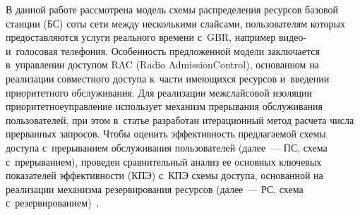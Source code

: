 \begin{multicols}{2}
В данной работе рассмотрена модель схемы распределения ресурсов базовой 
станции (БС) соты сети между несколькими слайсами, пользователям которых 
предоставляются услуги реального времени с~GBR, например видео- и~голосовая 
телефония.
Особенность предложенной модели заключается в~управлении доступом RAC 
(Radio Admission\linebreak Control), основанном на реализации совместного доступа к~части 
имеющихся ресурсов и~введении приоритетного обслуживания. Для реализации 
межслайсовой изоляции приоритетное\linebreak управление использует механизм прерывания 
обслуживания пользователей, при этом в~\mbox{статье} раз\-работан итерационный метод 
расчета числа прерванных запросов. Чтобы оценить эффективность предлагаемой 
схемы доступа с~прерыванием обслуживания пользователей (далее~--- ПС,  схема 
с~прерыванием), проведен сравнительный анализ ее основных ключевых показателей 
эффективности (КПЭ) с~КПЭ схемы доступа, основанной на реализации механизма 
резервирования ресурсов (далее~--- РС, схема с~резервированием)~\cite{Luu2022,Rehman2022}.

\begin{table*}[b]\small %
\vspace*{-16pt}
\begin{center}
\label{tab:Notations}
\vspace*{2ex}


\end{center}
\end{table*}
\end{multicols}
